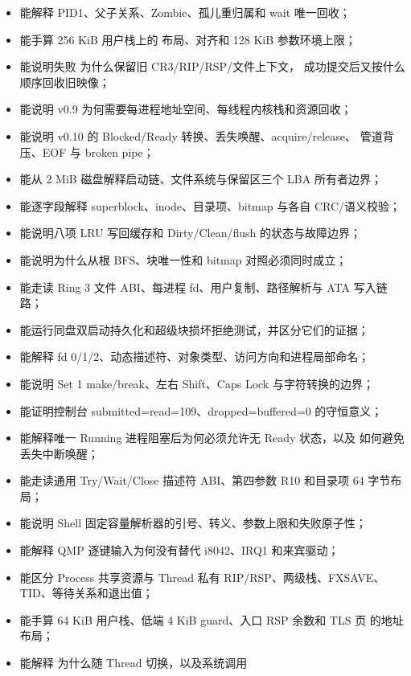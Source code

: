 \begin{itemize}
        并说明普通用户程序为什么不再内嵌到正常 Kernel；
  \item 能解释 PID1、父子关系、Zombie、孤儿重归属和 wait 唯一回收；
  \item 能手算 256 KiB 用户栈上的  布局、对齐和
        128 KiB 参数环境上限；
  \item 能说明失败  为什么保留旧 CR3/RIP/RSP/文件上下文，
        成功提交后又按什么顺序回收旧映像；
  \item 能说明 v0.9 为何需要每进程地址空间、每线程内核栈和资源回收；
  \item 能说明 v0.10 的 Blocked/Ready 转换、丢失唤醒、acquire/release、
  管道背压、EOF 与 broken pipe；
  \item 能从 2 MiB 磁盘解释启动链、文件系统与保留区三个 LBA 所有者边界；
  \item 能逐字段解释 superblock、inode、目录项、bitmap 与各自 CRC/语义校验；
  \item 能说明八项 LRU 写回缓存和 Dirty/Clean/flush 的状态与故障边界；
  \item 能说明为什么从根 BFS、块唯一性和 bitmap 对照必须同时成立；
  \item 能走读 Ring 3 文件 ABI、每进程 fd、用户复制、路径解析与 ATA 写入链路；
  \item 能运行同盘双启动持久化和超级块损坏拒绝测试，并区分它们的证据；
  \item 能解释 fd 0/1/2、动态描述符、对象类型、访问方向和进程局部命名；
  \item 能说明 Set 1 make/break、左右 Shift、Caps Lock 与字符转换的边界；
  \item 能证明控制台 submitted=read=109、dropped=buffered=0 的守恒意义；
  \item 能解释唯一 Running 进程阻塞后为何必须允许无 Ready 状态，以及
         如何避免丢失中断唤醒；
  \item 能走读通用 Try/Wait/Close 描述符 ABI、第四参数 R10 和目录项 64 字节布局；
  \item 能说明 Shell 固定容量解析器的引号、转义、参数上限和失败原子性；
  \item 能解释 QMP 逐键输入为何没有替代 i8042、IRQ1 和来宾驱动；
  \item 能区分 Process 共享资源与 Thread 私有 RIP/RSP、两级栈、FXSAVE、
        TID、等待关系和退出值；
  \item 能手算 64 KiB 用户栈、低端 4 KiB guard、入口 RSP 余数和 TLS 页
        的地址布局；
  \item 能解释  为什么随 Thread 切换，以及系统调用

\end{itemize}
